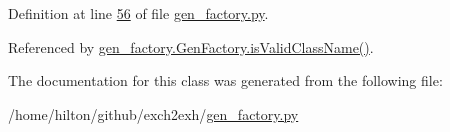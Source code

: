 Definition at line \hyperlink{gen__factory_8py_source_l00056}{56} of file \hyperlink{gen__factory_8py_source}{gen\+\_\+factory.\+py}.



Referenced by \hyperlink{gen__factory_8py_source_l00065}{gen\+\_\+factory.\+Gen\+Factory.\+is\+Valid\+Class\+Name()}.



The documentation for this class was generated from the following file\+:\begin{DoxyCompactItemize}
\item 
/home/hilton/github/exch2exh/\hyperlink{gen__factory_8py}{gen\+\_\+factory.\+py}\end{DoxyCompactItemize}
